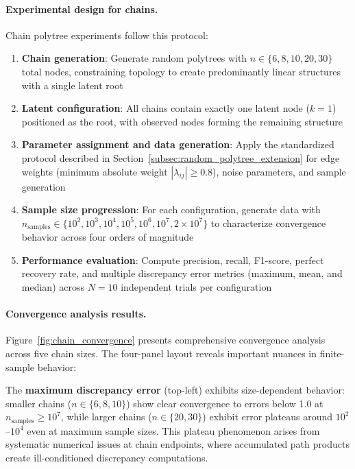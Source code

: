 \documentclass[11pt,a4paper]{article}
\numberwithin{equation}{section}
\begin{document}
\paragraph{Experimental design for chains.} Chain polytree experiments follow this protocol:

\begin{enumerate}[label=(\arabic*)]
\item \textbf{Chain generation}: Generate random polytrees with $n \in \{6, 8, 10, 20, 30\}$ total nodes, constraining topology to create predominantly linear structures with a single latent root

\item \textbf{Latent configuration}: All chains contain exactly one latent node ($k=1$) positioned as the root, with observed nodes forming the remaining structure

\item \textbf{Parameter assignment and data generation}: Apply the standardized protocol described in Section~\ref{subsec:random_polytree_extension} for edge weights (minimum absolute weight $|\lambda_{ij}| \geq 0.8$), noise parameters, and sample generation

\item \textbf{Sample size progression}: For each configuration, generate data with $n_{\text{samples}} \in \{10^2, 10^3, 10^4, 10^5, 10^6, 10^7, 2 \times 10^7\}$ to characterize convergence behavior across four orders of magnitude

\item \textbf{Performance evaluation}: Compute precision, recall, F1-score, perfect recovery rate, and multiple discrepancy error metrics (maximum, mean, and median) across $N = 10$ independent trials per configuration
\end{enumerate}

\paragraph{Convergence analysis results.} Figure~\ref{fig:chain_convergence} presents comprehensive convergence analysis across five chain sizes. The four-panel layout reveals important nuances in finite-sample behavior:

The \textbf{maximum discrepancy error} (top-left) exhibits size-dependent behavior: smaller chains ($n \in \{6, 8, 10\}$) show clear convergence to errors below 1.0 at $n_{\text{samples}} \geq 10^7$, while larger chains ($n \in \{20, 30\}$) exhibit error plateaus around $10^2$--$10^4$ even at maximum sample sizes. This plateau phenomenon arises from systematic numerical issues at chain endpoints, where accumulated path products create ill-conditioned discrepancy computations.
\end{document}
